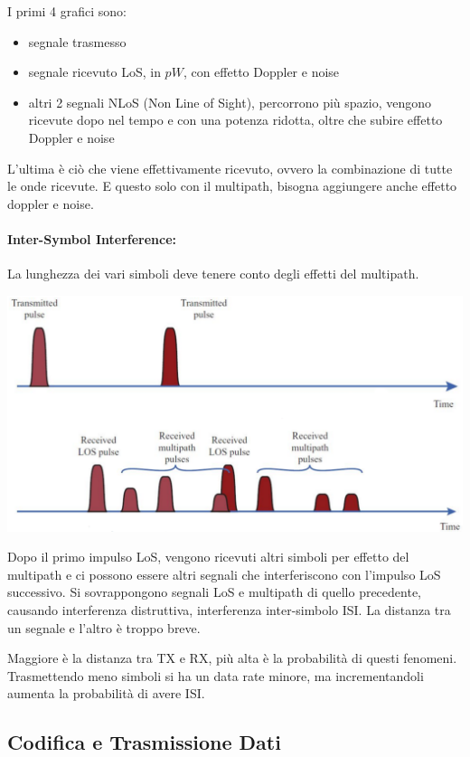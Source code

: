 I primi 4 grafici sono:
\begin{itemize}
	\item segnale trasmesso
    
	\item segnale ricevuto LoS, in $pW$, con effetto Doppler e noise

	\item altri 2 segnali NLoS (Non Line of Sight), percorrono più spazio, vengono ricevute dopo nel tempo e con una potenza ridotta, oltre che subire effetto Doppler e noise
\end{itemize}

L'ultima è ciò che viene effettivamente ricevuto, ovvero la combinazione di tutte le onde ricevute. E questo solo con il multipath, bisogna aggiungere anche effetto doppler e noise. 

\paragraph{Inter-Symbol Interference:} La lunghezza dei vari simboli deve tenere conto degli effetti del multipath. 
\begin{center}
	\includegraphics[width=0.8\linewidth]{img/wireless/ISI1}
\end{center}

Dopo il primo impulso LoS, vengono ricevuti altri simboli per effetto del multipath e ci possono essere altri segnali che interferiscono con l'impulso LoS successivo. Si sovrappongono segnali LoS e multipath di quello precedente, causando interferenza distruttiva, interferenza inter-simbolo ISI. La distanza tra un segnale e l'altro è troppo breve.

Maggiore è la distanza tra TX e RX, più alta è la probabilità di questi fenomeni. Trasmettendo meno simboli si ha un data rate minore, ma incrementandoli aumenta la probabilità di avere ISI.

\subsection{Codifica e Trasmissione Dati}


